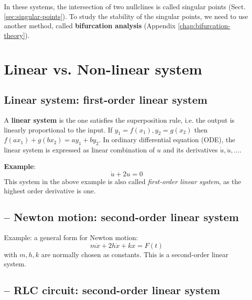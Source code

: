 In these systems, the intersection of two nullclines is called singular points
(Sect.\ref{sec:singular-points}). To study the stability of the singular points,
we need to use another method, called {\bf bifurcation analysis} (Appendix
\ref{chap:bifurcation-theory}).
% 


\section{Linear vs. Non-linear system}
\label{sec:introduction-2}


\subsection{Linear system: first-order linear system}
\label{sec:linear-non-linear}

A {\bf linear system} is the one satisfies the superposition rule,
i.e. the output is linearly proportional to the input. If $y_1=f(x_1),
y_2=g(x_2)$ then $f(ax_1)+g(bx_2) = ay_1 + by_2$.  In ordinary
differential equation (ODE), the linear system is expressed as linear
combination of $u$ and its derivatives $\dot{u},\ddot{u},...$.

{\bf Example}:
\begin{equation}
  \label{eq:589}
  \dot{u} + 2u = 0
\end{equation}
This system in the above example is also called {\it first-order linear system},
as the highest order derivative is one.  

\subsection{-- Newton motion: second-order linear system}
\label{sec:Newtonian-motion-system}

Example: a general form for Newton motion:
\begin{equation}
  \label{eq:101}
  m\ddot{x}+2h\dot{x}+kx=F(t)
\end{equation}
with $m,h,k$ are normally chosen as constants. This is a second-order
linear system.

\subsection{-- RLC circuit: second-order linear system}

